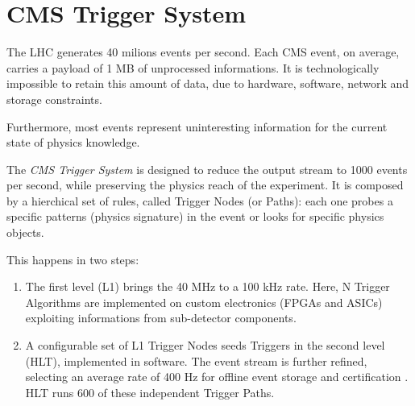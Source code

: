 \section{CMS Trigger System}


The LHC generates 40 milions events per second. Each CMS event, on average, carries a payload of 1 MB of unprocessed informations. It is technologically impossible to retain this amount of data, due to hardware, software, network and storage constraints.

Furthermore, most events represent uninteresting information for the current state of physics knowledge.

The \textit{CMS Trigger System} is designed to reduce the output stream to 1000 events per second, while preserving the physics reach of the experiment.
It is composed by a hierchical set of rules, called Trigger Nodes (or Paths): each one probes a specific patterns (physics signature) in the event or looks for specific physics objects.

This happens in two steps:

\begin{enumerate}

	\item The first level (L1) \cite{Bayatyan:706847} brings the 40 MHz to a 100 kHz rate. Here, N Trigger Algorithms are implemented on custom electronics (FPGAs and ASICs) exploiting informations from sub-detector components.

	\item A configurable set of L1 Trigger Nodes seeds Triggers in the second level (HLT), implemented in software. The event stream is further refined, selecting an average rate of 400 Hz for offline event storage and certification \cite{Khachatryan_2017}. HLT runs 600 of these independent Trigger Paths.

\end{enumerate}